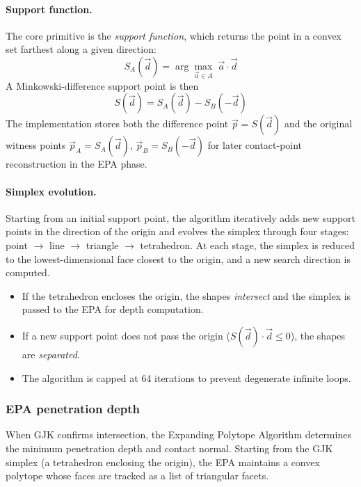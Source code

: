 \documentclass[Orbiter Technical Reference.tex]{subfiles}
\begin{document}
\paragraph{Support function.}
The core primitive is the \emph{support function}, which returns the
point in a convex set farthest along a given direction:
\begin{equation*}
S_A(\vec{d}) = \arg\max_{\vec{a}\in A}\; \vec{a}\cdot\vec{d}
\end{equation*}
A Minkowski-difference support point is then
\begin{equation*}
S(\vec{d}) = S_A(\vec{d}) - S_B(-\vec{d})
\end{equation*}
The implementation stores both the difference point $\vec{p} = S(\vec{d})$
and the original witness points $\vec{p}_A = S_A(\vec{d})$,
$\vec{p}_B = S_B(-\vec{d})$ for later contact-point reconstruction
in the EPA phase.

\paragraph{Simplex evolution.}
Starting from an initial support point, the algorithm iteratively
adds new support points in the direction of the origin and evolves the
simplex through four stages: point $\to$ line $\to$ triangle $\to$
tetrahedron.  At each stage, the simplex is reduced to the
lowest-dimensional face closest to the origin, and a new search
direction is computed.

\begin{itemize}
\item If the tetrahedron encloses the origin, the shapes \emph{intersect}
  and the simplex is passed to the EPA for depth computation.
\item If a new support point does not pass the origin
  ($S(\vec{d}) \cdot \vec{d} \le 0$), the shapes are \emph{separated}.
\item The algorithm is capped at 64 iterations to prevent degenerate
  infinite loops.
\end{itemize}

\subsubsection{EPA penetration depth}
\label{ssec:epa}
When GJK confirms intersection, the Expanding Polytope Algorithm
determines the minimum penetration depth and contact normal.  Starting
from the GJK simplex (a tetrahedron enclosing the origin), the EPA
maintains a convex polytope whose faces are tracked as a list of
triangular facets.
\end{document}
